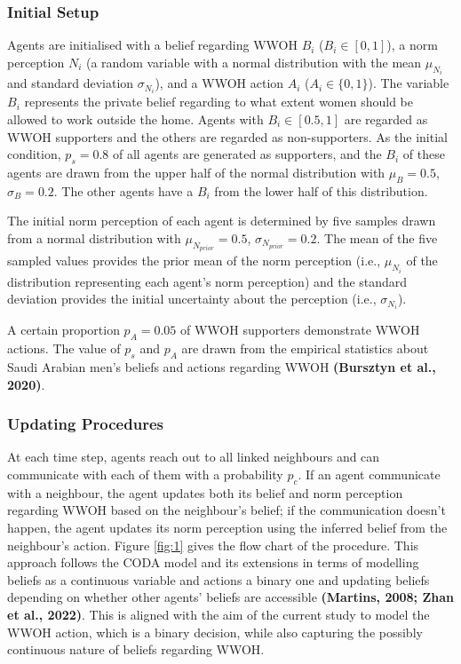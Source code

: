 \documentclass[
  11pt,
]{article}
\begin{document}
\hypertarget{initial-setup}{%
\subsubsection{Initial Setup}\label{initial-setup}}

Agents are initialised with a belief regarding WWOH \(B_i\)
(\(B_i \in [0, 1]\)), a norm perception \(N_i\) (a random variable with
a normal distribution with the mean \(\mu_{N_i}\) and standard deviation
\(\sigma_{N_i}\)), and a WWOH action \(A_i\) (\(A_i \in \{0, 1\}\)). The
variable \(B_i\) represents the private belief regarding to what extent
women should be allowed to work outside the home. Agents with
\(B_i \in [0.5, 1]\) are regarded as WWOH supporters and the others are
regarded as non-supporters. As the initial condition, \(p_s = 0.8\) of
all agents are generated as supporters, and the \(B_i\) of these agents
are drawn from the upper half of the normal distribution with
\(\mu_B = 0.5\), \(\sigma_B = 0.2\). The other agents have a \(B_i\)
from the lower half of this distribution.

The initial norm perception of each agent is determined by five samples
drawn from a normal distribution with \(\mu_{N_{prior}} = 0.5\),
\(\sigma_{N_{prior}} = 0.2\). The mean of the five sampled values
provides the prior mean of the norm perception (i.e., \(\mu_{N_i}\) of
the distribution representing each agent's norm perception) and the
standard deviation provides the initial uncertainty about the perception
(i.e., \(\sigma_{N_i}\)).

A certain proportion \(p_A = 0.05\) of WWOH supporters demonstrate WWOH
actions. The value of \(p_s\) and \(p_A\) are drawn from the empirical
statistics about Saudi Arabian men's beliefs and actions regarding WWOH
\textbf{(Bursztyn et al., 2020)}.

\hypertarget{updating-procedures}{%
\subsubsection{Updating Procedures}\label{updating-procedures}}

At each time step, agents reach out to all linked neighbours and can
communicate with each of them with a probability \(p_c\). If an agent
communicate with a neighbour, the agent updates both its belief and norm
perception regarding WWOH based on the neighbour's belief; if the
communication doesn't happen, the agent updates its norm perception
using the inferred belief from the neighbour's action. Figure
\ref{fig:1} gives the flow chart of the procedure. This approach follows
the CODA model and its extensions in terms of modelling beliefs as a
continuous variable and actions a binary one and updating beliefs
depending on whether other agents' beliefs are accessible
\textbf{(Martins, 2008; Zhan et al., 2022)}. This is aligned with the
aim of the current study to model the WWOH action, which is a binary
decision, while also capturing the possibly continuous nature of beliefs
regarding WWOH.
\end{document}
